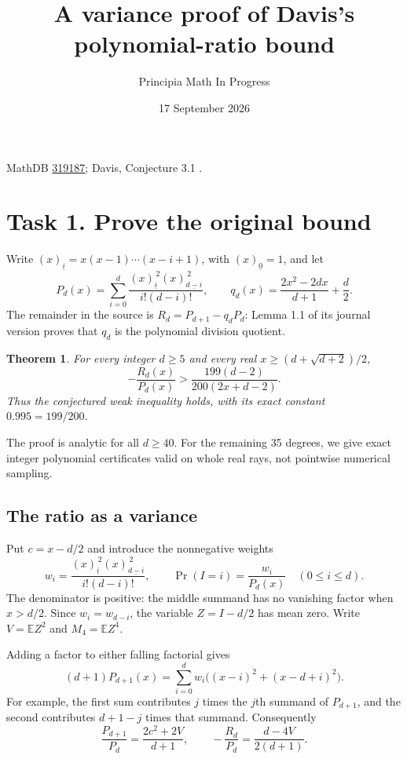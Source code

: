 \documentclass[11pt]{article}
\title{A variance proof of Davis's polynomial-ratio bound}
\author{Principia Math In Progress}
\date{17 September 2026}
\newtheorem{theorem}{Theorem}
\begin{document}
\maketitle
\noindent MathDB \href{https://mathdb.com/p/319187}{319187};
Davis, Conjecture 3.1 \cite{D}.

\section*{Task 1. Prove the original bound}
Write $(x)_{\underline i}=x(x-1)\cdots(x-i+1)$, with
$(x)_{\underline0}=1$, and let
\[
 P_d(x)=\sum_{i=0}^d
 \frac{(x)_{\underline i}^{\,2}(x)_{\underline{d-i}}^{\,2}}{i!(d-i)!},
 \qquad
 q_d(x)=\frac{2x^2-2dx}{d+1}+\frac d2.
\]
The remainder in the source is $R_d=P_{d+1}-q_dP_d$:
Lemma 1.1 of its journal version proves that $q_d$ is the polynomial
division quotient.

\begin{theorem}\label{thm:main}
For every integer $d\ge5$ and every real
$x\ge(d+\sqrt{d+2})/2$,
\begin{equation}\label{eq:target}
 -\frac{R_d(x)}{P_d(x)}>
       \frac{199(d-2)}{200(2x+d-2)}.
\end{equation}
Thus the conjectured weak inequality holds, with its exact constant
$0.995=199/200$.
\end{theorem}
The proof is analytic for all $d\ge40$. For the remaining 35 degrees,
we give exact integer polynomial certificates valid on whole real
rays, not pointwise numerical sampling.

\subsection*{The ratio as a variance}
Put $c=x-d/2$ and introduce the nonnegative weights
\[
 w_i=\frac{(x)_{\underline i}^{\,2}(x)_{\underline{d-i}}^{\,2}}{i!(d-i)!},
 \qquad \Pr(I=i)=\frac{w_i}{P_d(x)}\quad(0\le i\le d).
\]
The denominator is positive: the middle summand has no vanishing
factor when $x>d/2$. Since $w_i=w_{d-i}$, the variable $Z=I-d/2$
has mean zero. Write $V=\mathbb E Z^2$ and $M_4=\mathbb E Z^4$.

Adding a factor to either falling factorial gives
\[
 (d+1)P_{d+1}(x)
   =\sum_{i=0}^d w_i\bigl((x-i)^2+(x-d+i)^2\bigr).
\]
For example, the first sum contributes $j$ times the $j$th summand
of $P_{d+1}$, and the second contributes $d+1-j$ times that summand.
Consequently
\begin{equation}\label{eq:variance}
 \frac{P_{d+1}}{P_d}=\frac{2c^2+2V}{d+1},\qquad
 -\frac{R_d}{P_d}=\frac{d-4V}{2(d+1)}.
\end{equation}
\end{document}
